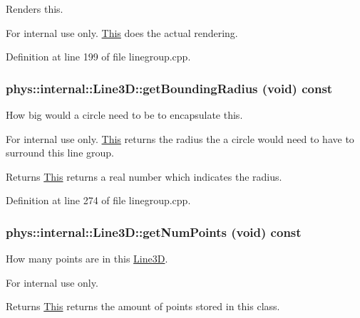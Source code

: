 Renders this. 

\begin{DoxyInternal}{For internal use only.}
\hyperlink{structThis}{This} does the actual rendering. \end{DoxyInternal}


Definition at line 199 of file linegroup.cpp.

\hypertarget{classphys_1_1internal_1_1Line3D_a3fdd0ff2b7b22cebc71f796431afc7c8}{
\subsubsection[{getBoundingRadius}]{ phys::internal::Line3D::getBoundingRadius (void) const}}
\label{d4/db5/classphys_1_1internal_1_1Line3D_a3fdd0ff2b7b22cebc71f796431afc7c8}


How big would a circle need to be to encapsulate this. 

\begin{DoxyInternal}{For internal use only.}
\hyperlink{structThis}{This} returns the radius the a circle would need to have to surround this line group. \begin{DoxyReturn}{Returns}
\hyperlink{structThis}{This} returns a real number which indicates the radius. 
\end{DoxyReturn}
\end{DoxyInternal}


Definition at line 274 of file linegroup.cpp.

\hypertarget{classphys_1_1internal_1_1Line3D_ab72a9dab3a355035c24c15e4a737ea2f}{
\subsubsection[{getNumPoints}]{ phys::internal::Line3D::getNumPoints (void) const}}
\label{d4/db5/classphys_1_1internal_1_1Line3D_ab72a9dab3a355035c24c15e4a737ea2f}


How many points are in this \hyperlink{classphys_1_1internal_1_1Line3D}{Line3D}. 

\begin{DoxyInternal}{For internal use only.}
\begin{DoxyReturn}{Returns}
\hyperlink{structThis}{This} returns the amount of points stored in this class. 
\end{DoxyReturn}
\end{DoxyInternal}


